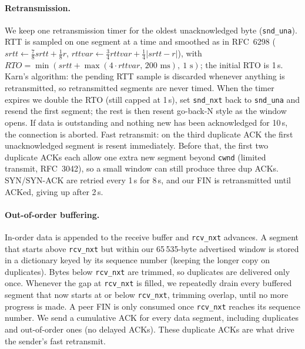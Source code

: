 \documentclass[10pt,a4paper]{article}
\newcommand{\cmd}[1]{\texttt{#1}}
\begin{document}
\paragraph{Retransmission.}
We keep one retransmission timer for the oldest unacknowledged byte (\cmd{snd\_una}).
RTT is sampled on one segment at a time and smoothed as in RFC~6298
($\mathit{srtt}\leftarrow\frac78\mathit{srtt}+\frac18 r$,
$\mathit{rttvar}\leftarrow\frac34\mathit{rttvar}+\frac14|\mathit{srtt}-r|$), with
$\mathit{RTO}=\min(\mathit{srtt}+\max(4\cdot\mathit{rttvar},\,200\mbox{ ms}),\ 1\mbox{ s})$;
the initial RTO is 1\,s. Karn's algorithm: the pending RTT sample is discarded whenever
anything is retransmitted, so retransmitted segments are never timed. When the timer
expires we double the RTO (still capped at 1\,s), set \cmd{snd\_nxt} back to \cmd{snd\_una}
and resend the first segment; the rest is then resent go-back-N style as the window
opens. If data is outstanding and nothing new has been acknowledged for 10\,s, the
connection is aborted. Fast retransmit: on the third duplicate ACK the first
unacknowledged segment is resent immediately. Before that, the first two duplicate ACKs each allow
one extra new segment beyond \cmd{cwnd} (limited transmit, RFC~3042), so a
small window can still produce three dup ACKs. SYN/SYN-ACK are retried every 1\,s for 8\,s,
and our FIN is retransmitted until ACKed, giving up after 2\,s.

\paragraph{Out-of-order buffering.}
In-order data is appended to the receive buffer and \cmd{rcv\_nxt} advances. A segment
that starts above \cmd{rcv\_nxt} but within our 65\,535-byte advertised window is stored in
a dictionary keyed by its sequence number (keeping the longer copy on duplicates). Bytes
below \cmd{rcv\_nxt} are trimmed, so duplicates are delivered only once. Whenever the gap at
\cmd{rcv\_nxt} is filled, we repeatedly drain every buffered segment that now starts
at or below \cmd{rcv\_nxt}, trimming overlap, until no more progress is made. A peer FIN is
only consumed once \cmd{rcv\_nxt} reaches its sequence number. We send a cumulative ACK
for every data segment, including duplicates and out-of-order ones (no delayed ACKs).
These duplicate ACKs are what drive the sender's fast retransmit.
\end{document}
